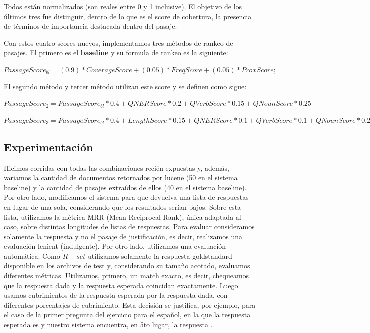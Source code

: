 Todos están normalizados (son reales entre 0 y 1 inclusive). El objetivo de los últimos tres fue distinguir, dentro de lo que es el score de cobertura, la presencia de términos de importancia destacada dentro del pasaje.


Con estos cuatro scores nuevos, implementamos tres métodos de rankeo de pasajes. El primero es el \textbf{baseline} y su formula de rankeo es la siguiente: \newline

$PassageScore_{bl} = (0.9)*CoverageScore + (0.05)*FreqScore+ (0.05)*ProxScore;$ \newline

El segundo método y tercer método utilizan este score y se definen como sigue:\newline

$PassageScore_2 =  PassageScore_{bl} * 0.4 + QNERScore * 0.2 + QVerbScore*0.15	+ QNounScore * 0.25 $\newline

$PassageScore_3 =  PassageScore_{bl} * 0.4 + LengthScore * 0.15 + QNERScore * 0.1 + QVerbScore*0.1	+ QNounScore * 0.25 $\newline


\subsection{Experimentación}
\label{sec:eval}

Hicimos corridas con todas las combinaciones recién expuestas y, además, variamos la cantidad de documentos retornados por lucene (50 en el sistema baseline) y la cantidad de pasajes extraídos de ellos (40 en el sistema baseline).  Por otro lado, modificamos el sistema para que devuelva una lista de respuestas en lugar de una sola, considerando que los resultados serían bajos. Sobre esta lista, utilizamos la métrica MRR (Mean Reciprocal Rank), única adaptada al caso, sobre distintas longitudes de listas de respuestas. Para evaluar consideramos solamente la respuesta y no el pasaje de justificación, es decir, realizamos una evaluación lenient (indulgente). Por otro lado, utilizamos una evaluación automática. Como $R-set$ utilizamos solamente la respuesta goldstandard disponible en los archivos de test y, considerando su tamaño acotado, evaluamos diferentes métricas. Utilizamos, primero, un match exacto, es decir, chequeamos que la respuesta dada y la respuesta esperada coincidan exactamente. Luego usamos cubrimientos de la respuesta esperada por la respuesta dada, con diferentes porcentajes de cubrimiento. Esta decisión se justifica, por ejemplo, para el caso de la primer pregunta del ejercicio para el español, en la que la respuesta esperada es  y nuestro sistema encuentra, en 5to lugar, la respuesta .

